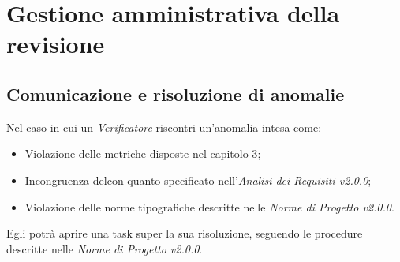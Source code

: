 \chapter{Gestione amministrativa della revisione}
\section{Comunicazione e risoluzione di anomalie}

Nel caso in cui un \textit{Verificatore} riscontri un'anomalia intesa come:

\begin{itemize}
	\item Violazione delle metriche disposte nel \hyperref[Metriche]{capitolo 3};
	\item Incongruenza delcon quanto specificato nell'\textit{Analisi dei Requisiti v2.0.0};
	\item Violazione delle norme tipografiche descritte nelle \textit{Norme di Progetto v2.0.0}.
\end{itemize}

Egli potrà aprire una task super la sua risoluzione, seguendo le procedure descritte nelle \textit{Norme di Progetto v2.0.0}.
